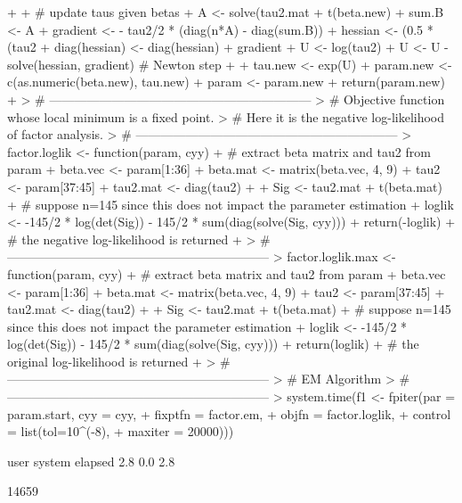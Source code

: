 \documentclass{article}
\begin{document}
\begin{Schunk}
\begin{Sinput}
{+   
+   # update taus given betas
+   A <- solve(tau2.mat + t(beta.new) %*% beta.new)
+   sum.B <- A %*% (n * cyy) %*% A
+   gradient <- - tau2/2 * (diag(n*A) - diag(sum.B))
+   hessian <- (0.5 * (tau2 %*% t(tau2))) * (A * (n * A - 2 * sum.B))
+   diag(hessian) <- diag(hessian) + gradient
+   U <- log(tau2)
+   U <- U - solve(hessian, gradient) #  Newton step
+   
+   tau.new <- exp(U)
+   param.new <- c(as.numeric(beta.new), tau.new)
+   param <- param.new
+   return(param.new)
+ }
> # ---------------------------------------------------------------
> # Objective function whose local minimum is a fixed point. 
> # Here it is the negative log-likelihood of factor analysis.
> # ---------------------------------------------------------------
> factor.loglik <- function(param, cyy){
+   # extract beta matrix and tau2 from param
+   beta.vec <- param[1:36]
+   beta.mat <- matrix(beta.vec, 4, 9)
+   tau2 <- param[37:45]
+   tau2.mat <- diag(tau2)
+   
+   Sig <- tau2.mat + t(beta.mat) %*% beta.mat
+   # suppose n=145 since this does not impact the parameter estimation
+   loglik <- -145/2 * log(det(Sig)) - 145/2 * sum(diag(solve(Sig, cyy)))
+   return(-loglik)
+   # the negative log-likelihood is returned
+ }
> # ---------------------------------------------------------------
> factor.loglik.max <- function(param, cyy){
+   # extract beta matrix and tau2 from param
+   beta.vec <- param[1:36]
+   beta.mat <- matrix(beta.vec, 4, 9)
+   tau2 <- param[37:45]
+   tau2.mat <- diag(tau2)
+   
+   Sig <- tau2.mat + t(beta.mat) %*% beta.mat
+   # suppose n=145 since this does not impact the parameter estimation
+   loglik <- -145/2 * log(det(Sig)) - 145/2 * sum(diag(solve(Sig, cyy)))
+   return(loglik)
+   # the original log-likelihood is returned
+ }
> # ---------------------------------------------------------------
> # EM Algorithm
> # ---------------------------------------------------------------
> system.time(f1 <- fpiter(par = param.start, cyy = cyy, 
+                          fixptfn = factor.em, 
+                          objfn = factor.loglik,
+                          control = list(tol=10^(-8), 
+                                         maxiter = 20000)))
\end{Sinput}
\begin{Soutput}
   user  system elapsed 
    2.8     0.0     2.8 
\end{Soutput}
\begin{Soutput}
[1] 14659
\end{Soutput}

\end{Schunk}
\end{document}
